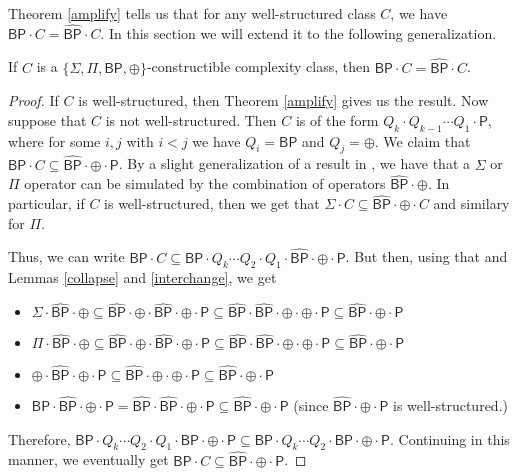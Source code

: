 \documentclass[11pt]{article}
\newcommand{\bp}{\textsf{BP}}
\newcommand{\strongbp}{\widehat{\textsf{BP}}}
\newcommand{\parity}{\oplus}
\newcommand{\p}{\textsf{P}}
\begin{document}
Theorem \ref{amplify} tells us that for any well-structured class $C$, we have $\bp\cdot C = \strongbp\cdot C$. In this section we will extend it to the following generalization.

\begin{theorem}\label{fullamplify}
If $C$ is a $\{\Sigma,\Pi,\bp,\parity\}$-constructible complexity class, then $\bp\cdot C = \strongbp\cdot C$.
\end{theorem}
\begin{proof}
If $C$ is well-structured, then Theorem \ref{amplify} gives us the result. Now suppose that $C$ is not well-structured. Then $C$ is of the form $Q_k\cdot Q_{k-1}\cdots Q_1\cdot \p$, where for some $i,j$ with $i < j$ we have $Q_i = \bp$ and $Q_j = \parity$. We claim that $\bp \cdot C \subseteq \strongbp \cdot \parity \cdot \p$. By a slight generalization of a result in \cite{Toda}, we have that a $\Sigma$ or $\Pi$ operator can be simulated by the combination of operators $\strongbp \cdot \parity$. In particular, if $C$ is well-structured, then we get that $\Sigma \cdot C \subseteq \strongbp \cdot \parity \cdot C$ and similary for $\Pi$.

Thus, we can write $\bp \cdot C \subseteq \bp \cdot Q_k \cdots Q_2 \cdot Q_1 \cdot \strongbp \cdot \parity \cdot \p$. But then, using that and Lemmas \ref{collapse} and \ref{interchange}, we get
\begin{itemize}
\item $\Sigma \cdot \strongbp \cdot \parity \subseteq \strongbp \cdot \parity \cdot \strongbp \cdot \parity\cdot\p \subseteq \strongbp \cdot \strongbp \cdot \parity \cdot \parity \cdot \p \subseteq \strongbp \cdot \parity \cdot \p$
\item $\Pi \cdot \strongbp \cdot \parity \subseteq \strongbp \cdot \parity \cdot \strongbp \cdot \parity\cdot\p \subseteq \strongbp \cdot \strongbp \cdot \parity \cdot \parity \cdot \p \subseteq  \strongbp \cdot \parity \cdot \p$
\item $\parity \cdot \strongbp \cdot \parity \cdot \p \subseteq \strongbp\cdot\parity\cdot\parity\cdot\p \subseteq \strongbp \cdot \parity \cdot \p$
\item $\bp \cdot \strongbp \cdot \parity \cdot \p = \strongbp \cdot \strongbp \cdot \parity \cdot \p\subseteq \strongbp \cdot \parity \cdot\p$ (since $\strongbp \cdot \parity \cdot \p$ is well-structured.)
\end{itemize}
Therefore, $\bp \cdot Q_k \cdots Q_2 \cdot Q_1 \cdot \bp \cdot \parity \cdot \p \subseteq \bp \cdot Q_k \cdots Q_2 \cdot \bp \cdot \parity \cdot \p$. Continuing in this manner, we eventually get $\bp \cdot C \subseteq \strongbp \cdot \parity \cdot \p$.


\end{proof}
\end{document}
